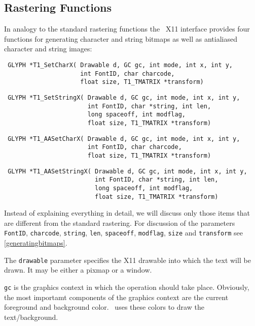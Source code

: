 \subsection{Rastering Functions}
In analogy to the standard rastering functions the \tonelib\ X11 interface
provides four functions for generating character and string bitmaps as well as
antialiased character and string images:
\precorr
\begin{verbatim}
 GLYPH *T1_SetCharX( Drawable d, GC gc, int mode, int x, int y,
                     int FontID, char charcode,
                     float size, T1_TMATRIX *transform)
\end{verbatim}\postcorr
\precorr
\begin{verbatim}
 GLYPH *T1_SetStringX( Drawable d, GC gc, int mode, int x, int y,
                       int FontID, char *string, int len,
                       long spaceoff, int modflag,
                       float size, T1_TMATRIX *transform)
\end{verbatim}\postcorr
\precorr
\begin{verbatim}
 GLYPH *T1_AASetCharX( Drawable d, GC gc, int mode, int x, int y,
                       int FontID, char charcode,
                       float size, T1_TMATRIX *transform)
\end{verbatim}\postcorr
\precorr
\begin{verbatim}
 GLYPH *T1_AASetStringX( Drawable d, GC gc, int mode, int x, int y,
                         int FontID, char *string, int len,
                         long spaceoff, int modflag,
                         float size, T1_TMATRIX *transform)
\end{verbatim}\postcorr
Instead of explaining everything in detail, we will discuss only those items
that are different from the standard rastering. For discussion of the
parameters \verb+FontID+, \verb+charcode+, \verb+string+, \verb+len+,
\verb+spaceoff+, \verb+modflag+, \verb+size+ and \verb+transform+ see
\ref{generatingbitmaps}. 

The \verb+drawable+ parameter specifies the X11 drawable into which the text
will be drawn. It may be either a pixmap or a window.

\verb+gc+ is the graphics context in which the operation should take
place. Obviously, the most importamt components of the graphics context are the
current foreground and background color. \tonelib\ uses these colors to draw
the text/background. 

